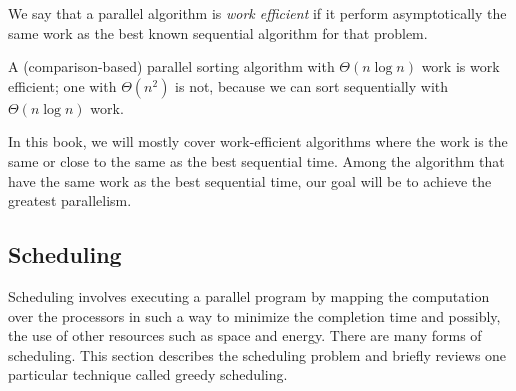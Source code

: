 \begin{flex}
\begin{definition}
 We say that a parallel algorithm is {\em
  work efficient} if it perform asymptotically the same work as the best known sequential algorithm for that problem. 
\end{definition}


\begin{example}
A (comparison-based) parallel sorting algorithm with
$\Theta(n\log{n})$ work is work efficient; one with $\Theta(n^2)$ is
not, because we can sort sequentially with $\Theta(n\log{n})$ work.
\end{example}
\end{flex}

\begin{note}
In this book, we will mostly cover work-efficient algorithms where
the work is the same or close to the same as the best sequential time.
%
Among the algorithm that have the same work as the best sequential
time, our goal will be to achieve the greatest parallelism.
\end{note}

\subsection{Scheduling}
\label{sec:analysis::models::language::scheduling}


\begin{gram}
Scheduling involves executing a parallel program by mapping the
computation over the processors in such a way to minimize
the completion time and possibly, the use of other resources such as
space and energy.
%
There are many forms of scheduling.
%
This section describes the scheduling problem and briefly reviews one
particular technique called greedy scheduling.
\end{gram}

